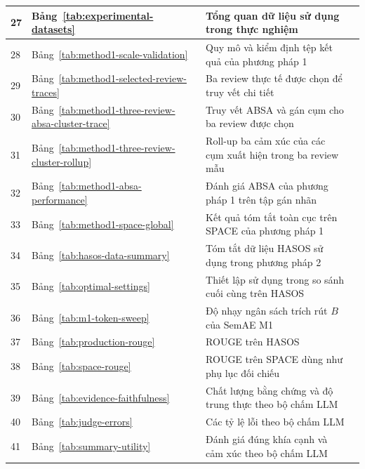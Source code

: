\documentclass[12pt,a4paper]{report}
\begin{document}
\begin{longtable}{|p{}|p{}|p{}|p{}|}
27 & Bảng~\ref{tab:experimental-datasets} & Tổng quan dữ liệu sử dụng trong thực nghiệm & \pageref{tab:experimental-datasets} \\ \hline
28 & Bảng~\ref{tab:method1-scale-validation} & Quy mô và kiểm định tệp kết quả của phương pháp 1 & \pageref{tab:method1-scale-validation} \\ \hline
29 & Bảng~\ref{tab:method1-selected-review-traces} & Ba review thực tế được chọn để truy vết chi tiết & \pageref{tab:method1-selected-review-traces} \\ \hline
30 & Bảng~\ref{tab:method1-three-review-absa-cluster-trace} & Truy vết ABSA và gán cụm cho ba review được chọn & \pageref{tab:method1-three-review-absa-cluster-trace} \\ \hline
31 & Bảng~\ref{tab:method1-three-review-cluster-rollup} & Roll-up ba cảm xúc của các cụm xuất hiện trong ba review mẫu & \pageref{tab:method1-three-review-cluster-rollup} \\ \hline
32 & Bảng~\ref{tab:method1-absa-performance} & Đánh giá ABSA của phương pháp 1 trên tập gán nhãn & \pageref{tab:method1-absa-performance} \\ \hline
33 & Bảng~\ref{tab:method1-space-global} & Kết quả tóm tắt toàn cục trên SPACE của phương pháp 1 & \pageref{tab:method1-space-global} \\ \hline
34 & Bảng~\ref{tab:hasos-data-summary} & Tóm tắt dữ liệu HASOS sử dụng trong phương pháp 2 & \pageref{tab:hasos-data-summary} \\ \hline
35 & Bảng~\ref{tab:optimal-settings} & Thiết lập sử dụng trong so sánh cuối cùng trên HASOS & \pageref{tab:optimal-settings} \\ \hline
36 & Bảng~\ref{tab:m1-token-sweep} & Độ nhạy ngân sách trích rút $B$ của SemAE M1 & \pageref{tab:m1-token-sweep} \\ \hline
37 & Bảng~\ref{tab:production-rouge} & ROUGE trên HASOS & \pageref{tab:production-rouge} \\ \hline
38 & Bảng~\ref{tab:space-rouge} & ROUGE trên SPACE dùng như phụ lục đối chiếu & \pageref{tab:space-rouge} \\ \hline
39 & Bảng~\ref{tab:evidence-faithfulness} & Chất lượng bằng chứng và độ trung thực theo bộ chấm LLM & \pageref{tab:evidence-faithfulness} \\ \hline
40 & Bảng~\ref{tab:judge-errors} & Các tỷ lệ lỗi theo bộ chấm LLM & \pageref{tab:judge-errors} \\ \hline
41 & Bảng~\ref{tab:summary-utility} & Đánh giá đúng khía cạnh và cảm xúc theo bộ chấm LLM & \pageref{tab:summary-utility} \\ \hline

\end{longtable}
\end{document}
